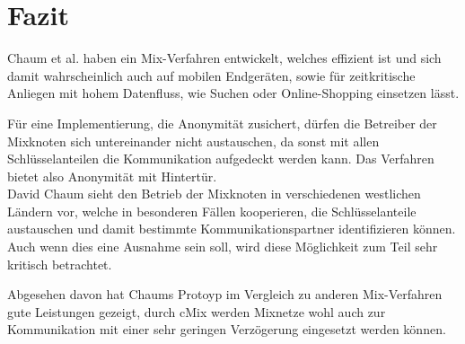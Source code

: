 \documentclass[
    fontsize=12pt,
    headings=small,
    parskip=half,           %
    bibliography=totoc,
    numbers=noenddot,       %
    open=any,               %
    final                   %
    ]{scrreprt}
\begin{document}
\chapter{Fazit}

Chaum et al. haben ein Mix-Verfahren entwickelt, welches effizient ist und sich damit wahrscheinlich auch auf mobilen Endgeräten, sowie für zeitkritische Anliegen mit hohem Datenfluss, wie Suchen oder Online-Shopping einsetzen lässt.

Für eine Implementierung, die Anonymität zusichert, dürfen die Betreiber der Mixknoten sich untereinander nicht austauschen, da sonst mit allen Schlüsselanteilen die Kommunikation aufgedeckt werden kann.
Das Verfahren bietet also Anonymität mit \glqq Hintertür\grqq.\\
David Chaum sieht den Betrieb der Mixknoten in verschiedenen westlichen Ländern vor, welche in besonderen Fällen kooperieren, die Schlüsselanteile austauschen und damit bestimmte Kommunikationspartner identifizieren können.
Auch wenn dies eine Ausnahme sein soll, wird diese Möglichkeit zum Teil sehr kritisch betrachtet. \cite{ChaumInterview}

Abgesehen davon hat Chaums Protoyp im Vergleich zu anderen Mix-Verfahren gute Leistungen gezeigt, durch cMix werden Mixnetze wohl auch zur Kommunikation mit einer sehr geringen Verzögerung eingesetzt werden können.



\end{document}
